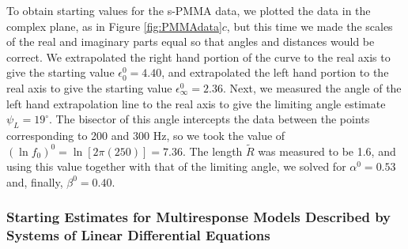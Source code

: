 \begin{example}
To obtain starting values for the s-PMMA data, we plotted the data
in the complex plane, as in Figure \ref{fig:PMMAdata}$c$, but this time we
made the scales of the real and imaginary parts equal so that angles and
distances would be correct.
We extrapolated the right hand portion of the curve to the real
axis to give the starting value $\epsilon_0^0 = 4.40$, and
extrapolated the left hand portion to the real
axis to give the starting value $\epsilon_{\infty}^0 = 2.36$.
Next, we measured the angle of the left hand extrapolation line to the
real axis to give the limiting angle estimate $\psi_L = 19^\circ$.
The bisector of this angle intercepts the data between the points
corresponding to 200 and 300 Hz, so we took the value of
$(\ln f_0 )^{0}=\ln[ 2 \pi ( 250 )]=7.36$.
The length $\tilde R$ was measured to be 1.6, and
using this value together with that of the limiting angle, we solved for
$\alpha^0 = 0.53$ and, finally, $\beta^0 = 0.40$.
\end{example}

\subsubsection{Starting Estimates for Multiresponse Models Described by
Systems of Linear Differential Equations}

